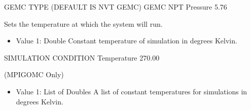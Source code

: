 \documentclass[letterpaper,10pt,english]{sphinxmanual}
\begin{document}
\begin{description}
\begin{itemize}
\end{itemize}

\begin{sphinxVerbatim}[commandchars=\\\{\}]
\PYGZsh{}\PYGZsh{}\PYGZsh{}\PYGZsh{}\PYGZsh{}\PYGZsh{}\PYGZsh{}\PYGZsh{}\PYGZsh{}\PYGZsh{}\PYGZsh{}\PYGZsh{}\PYGZsh{}\PYGZsh{}\PYGZsh{}\PYGZsh{}\PYGZsh{}\PYGZsh{}\PYGZsh{}\PYGZsh{}\PYGZsh{}\PYGZsh{}\PYGZsh{}\PYGZsh{}\PYGZsh{}\PYGZsh{}\PYGZsh{}\PYGZsh{}\PYGZsh{}\PYGZsh{}\PYGZsh{}\PYGZsh{}\PYGZsh{}
\PYGZsh{} GEMC TYPE (DEFAULT IS NVT GEMC)
\PYGZsh{}\PYGZsh{}\PYGZsh{}\PYGZsh{}\PYGZsh{}\PYGZsh{}\PYGZsh{}\PYGZsh{}\PYGZsh{}\PYGZsh{}\PYGZsh{}\PYGZsh{}\PYGZsh{}\PYGZsh{}\PYGZsh{}\PYGZsh{}\PYGZsh{}\PYGZsh{}\PYGZsh{}\PYGZsh{}\PYGZsh{}\PYGZsh{}\PYGZsh{}\PYGZsh{}\PYGZsh{}\PYGZsh{}\PYGZsh{}\PYGZsh{}\PYGZsh{}\PYGZsh{}\PYGZsh{}\PYGZsh{}\PYGZsh{}
GEMC        NPT
Pressure    5.76
\end{sphinxVerbatim}

\item[{\sphinxcode{\sphinxupquote{Temperature}}}] \leavevmode
Sets the temperature at which the system will run.
\begin{itemize}
\item {} 
Value 1: Double \sphinxhyphen{} Constant temperature of simulation in degrees Kelvin.

\end{itemize}

\begin{sphinxVerbatim}[commandchars=\\\{\}]
\PYGZsh{}\PYGZsh{}\PYGZsh{}\PYGZsh{}\PYGZsh{}\PYGZsh{}\PYGZsh{}\PYGZsh{}\PYGZsh{}\PYGZsh{}\PYGZsh{}\PYGZsh{}\PYGZsh{}\PYGZsh{}\PYGZsh{}\PYGZsh{}\PYGZsh{}\PYGZsh{}\PYGZsh{}\PYGZsh{}\PYGZsh{}\PYGZsh{}\PYGZsh{}\PYGZsh{}\PYGZsh{}\PYGZsh{}\PYGZsh{}\PYGZsh{}\PYGZsh{}\PYGZsh{}\PYGZsh{}\PYGZsh{}\PYGZsh{}
\PYGZsh{} SIMULATION CONDITION
\PYGZsh{}\PYGZsh{}\PYGZsh{}\PYGZsh{}\PYGZsh{}\PYGZsh{}\PYGZsh{}\PYGZsh{}\PYGZsh{}\PYGZsh{}\PYGZsh{}\PYGZsh{}\PYGZsh{}\PYGZsh{}\PYGZsh{}\PYGZsh{}\PYGZsh{}\PYGZsh{}\PYGZsh{}\PYGZsh{}\PYGZsh{}\PYGZsh{}\PYGZsh{}\PYGZsh{}\PYGZsh{}\PYGZsh{}\PYGZsh{}\PYGZsh{}\PYGZsh{}\PYGZsh{}\PYGZsh{}\PYGZsh{}\PYGZsh{}
Temperature   270.00
\end{sphinxVerbatim}

(MPI\sphinxhyphen{}GOMC Only)
\begin{itemize}
\item {} 
Value 1: List of Doubles \sphinxhyphen{} A list of constant temperatures for simulations in degrees Kelvin.


\end{itemize}
\end{description}
\end{document}
